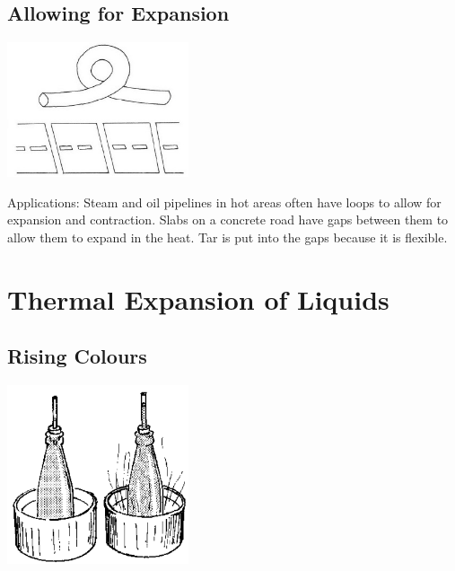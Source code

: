 \begin{multicols}{2}
\subsection{Allowing for Expansion}

\begin{center}
\includegraphics[width=0.4\textwidth]{./img/vso/allowing-expansion.jpg}
\end{center}

\begin{description*}
\item[Applications:]{Steam and oil pipelines in hot areas often have loops to allow for expansion and contraction. Slabs on a concrete road have gaps between them to allow them to expand in the heat. Tar is put into the gaps because it is flexible.}
\end{description*}


\section*{Thermal Expansion of Liquids}


\subsection{Rising Colours}

\begin{center}
\includegraphics[width=0.4\textwidth]{./img/source/rising-colours.png}
\end{center}


\end{multicols}
